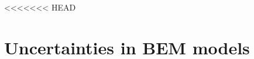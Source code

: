 \documentclass[review]{elsarticle}
\numberwithin{equation}{section}
\numberwithin{equation}{section}
\begin{document}
%
%
%
%

<<<<<<< HEAD


\section{Uncertainties in BEM models}\label{sec:model_description}
\end{document}
